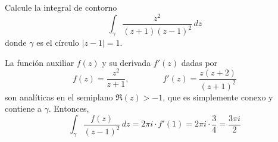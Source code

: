 \begin{exercise}
Calcule la integral de contorno
$$\int_\gamma \frac {z^2} {(z + 1) (z - 1)^2} \, dz$$
donde $\gamma$ es el círculo $|z - 1| = 1$.
\end{exercise}

\begin{solution}
La función auxiliar $f(z)$ y su derivada $f'(z)$ dadas por
$$
f(z) = \frac {z^2} {z + 1}, \qquad \qquad
f'(z) = \frac {z (z + 2)} {(z + 1)^2}
$$
son analíticas en el semiplano $\Re(z) > -1$, que es simplemente conexo y contiene a $\gamma$. Entonces,
$$\int_\gamma \frac {f(z)} {(z - 1)^2} \, dz = 2\pi i \cdot f'(1) = 2\pi i \cdot \frac 34 = \frac {3\pi i} 2$$
\end{solution}
